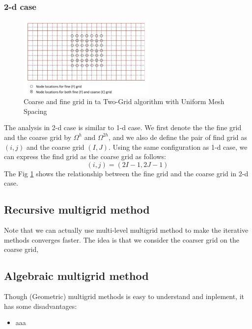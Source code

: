 \documentclass[onecolumn, conference]{IEEEtran}
\begin{document}
\subsubsection{2-d case}
\begin{figure}[htbp]
    \centering
    \includegraphics[width=0.6\textwidth]{2d_multigrid.png}
    \caption{Coarse and fine grid in ta Two-Grid algorithm with Uniform Mesh Spacing}
    \label{fig:2d_multigrid}
\end{figure}

The analysis in 2-d case is similar to 1-d case. We first denote the the fine grid and the coarse grid by $\Omega^h$ and $\Omega^{2h}$, and we also de define the pair of find grid as $(i,j)$ and the coarse grid $(I,J)$. Using the same configuration as 1-d case, we can express the find grid as the coarse grid as follows:
\begin{equation}
    (i,j)=(2I-1, 2J-1)
\end{equation}
The Fig \ref{fig:2d_multigrid} shows the relationship between the fine grid and the coarse grid in 2-d case.









\subsection{Recursive multigrid method}
Note that we can actually use multi-level multigrid method to make the iterative methods converges faster. The idea is that we consider the coarser grid on the coarse grid,




\subsection{Algebraic multigrid method}
Though (Geometric) multigrid methods is easy to understand and inplement, it has some disadvantages:
\begin{itemize}
    \item aaa
\end{itemize}
\end{document}
